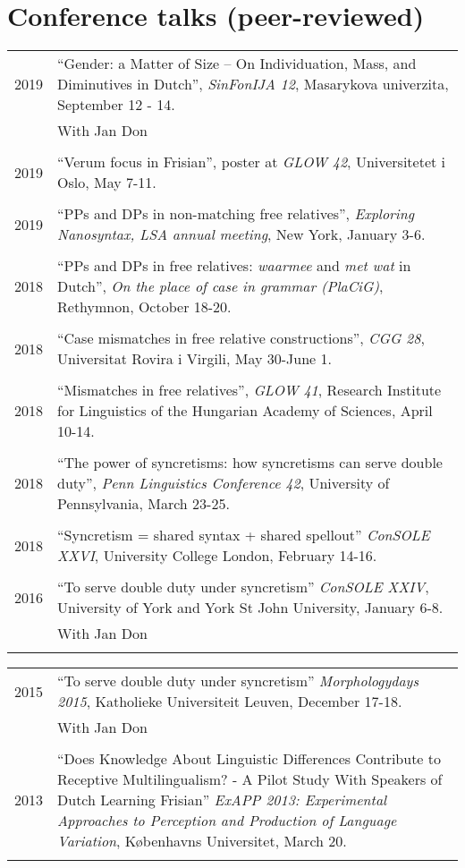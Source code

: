 \documentclass[12pt]{article}
\begin{document}
\section{Conference talks (peer-reviewed)}
\begin{tabular}{p{3cm}l}
2019 & ``Gender: a Matter of Size – On Individuation, Mass, and Diminutives in Dutch'', \textit{SinFonIJA 12}, Masarykova univerzita, September 12 - 14.\\
& With Jan Don\\&\\
2019 & ``Verum focus in Frisian'', poster at \emph{GLOW 42}, Universitetet i Oslo, May 7-11.\\&\\
2019 & ``PPs and DPs in non-matching free relatives'', \emph{Exploring Nanosyntax, LSA annual meeting}, New York, January 3-6.\\&\\
2018 & ``PPs and DPs in free relatives: \emph{waarmee} and \emph{met wat} in Dutch'', \emph{On the place of case in grammar (PlaCiG)}, Rethymnon, October 18-20.\\&\\
2018 & ``Case mismatches in free relative constructions'', \emph{CGG 28}, Universitat Rovira i Virgili, May 30-June 1.\\&\\
2018 & ``Mismatches in free relatives'', \emph{GLOW 41}, Research Institute for Linguistics of the Hungarian Academy of Sciences, April 10-14.\\&\\
2018 & ``The power of syncretisms: how syncretisms can serve double duty'', \emph{Penn Linguistics Conference 42}, University of Pennsylvania, March 23-25.\\&\\
2018 & ``Syncretism = shared syntax + shared spellout'' \emph{ConSOLE XXVI}, University College London, February 14-16.\\&\\
2016 & ``To serve double duty under syncretism'' \emph{ConSOLE XXIV}, University of York and York St John University, January 6-8.\\
& With Jan Don\\&\\
\end{tabular}

\begin{tabular}{p{3cm}l}
2015 & ``To serve double duty under syncretism'' \emph{Morphologydays 2015}, Katholieke Universiteit Leuven, December 17-18.\\
& With Jan Don\\&\\
2013 & ``Does Knowledge About Linguistic Differences Contribute to Receptive Multilingualism? - A Pilot Study With Speakers of Dutch Learning Frisian'' \emph{ExAPP 2013: Experimental Approaches to Perception and Production of Language Variation}, Københavns Universitet, March 20.\\&\\
\end{tabular}
\end{document}

